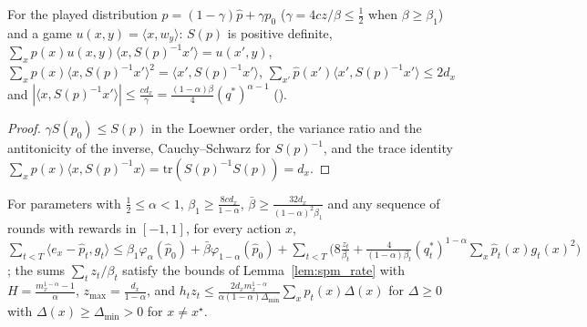 \begin{lemma}
  \label{lem:spm_estimates}
  \leanok
  For the played distribution $p = (1 - \gamma)\hat p + \gamma p_0$ ($\gamma = 4cz/\beta \le \frac12$
  when $\beta \ge \beta_1$) and a game $u(x, y) = \langle x, w_y\rangle$: $S(p)$ is positive
  definite, $\sum_x p(x) u(x, y) \langle x, S(p)^{-1} x'\rangle = u(x', y)$,
  $\sum_x p(x)\langle x, S(p)^{-1} x'\rangle^2 = \langle x', S(p)^{-1} x'\rangle$,
  $\sum_{x'} \hat p(x')\langle x', S(p)^{-1} x'\rangle \le 2 d_x$ and $|\langle x, S(p)^{-1}
  x'\rangle| \le \frac{c d_x}{\gamma} = \frac{(1 - \alpha)\beta}{4}(q^*)^{\alpha - 1}$
  (\cite[Eqs. (134) and (135)]{ito2024adaptive}).
\end{lemma}

\begin{proof}
  \leanok
  $\gamma S(p_0) \le S(p)$ in the Loewner order, the variance ratio and the antitonicity of the
  inverse, Cauchy--Schwarz for $S(p)^{-1}$, and the trace identity $\sum_x p(x)\langle x, S(p)^{-1}
  x\rangle = \mathrm{tr}(S(p)^{-1}S(p)) = d_x$.
\end{proof}

\begin{lemma}
  \label{lem:spm_pathwise}
  \leanok
  For parameters with $\frac12 \le \alpha < 1$, $\beta_1 \ge \frac{8cd_x}{1 - \alpha}$, $\bar\beta \ge
  \frac{32d_x}{(1 - \alpha)^2\beta_1}$ and any sequence of rounds with rewards in $[-1, 1]$, for
  every action $x$,
  $\sum_{t < T}\langle e_x - \hat p_t, g_t\rangle \le \beta_1\varphi_\alpha(\hat p_0) + \bar\beta
  \varphi_{1-\alpha}(\hat p_0) + \sum_{t < T}\bigl(8\frac{z_t}{\beta_t} + \frac{4}{(1 -
  \alpha)\beta_t}(q^*_t)^{1 - \alpha}\sum_x \hat p_t(x)g_t(x)^2\bigr)$; the sums
  $\sum_t z_t/\beta_t$ satisfy the bounds of Lemma~\ref{lem:spm_rate} with $H = \frac{m_x^{1 -
  \alpha} - 1}{\alpha}$, $z_{\max} = \frac{d_x}{1 - \alpha}$, and $h_t z_t \le \frac{2d_x m_x^{1 -
  \alpha}}{\alpha(1 - \alpha)\Delta_{\min}}\sum_x p_t(x)\Delta(x)$ for $\Delta \ge 0$ with
  $\Delta(x) \ge \Delta_{\min} > 0$ for $x \ne x^\star$.
\end{lemma}

